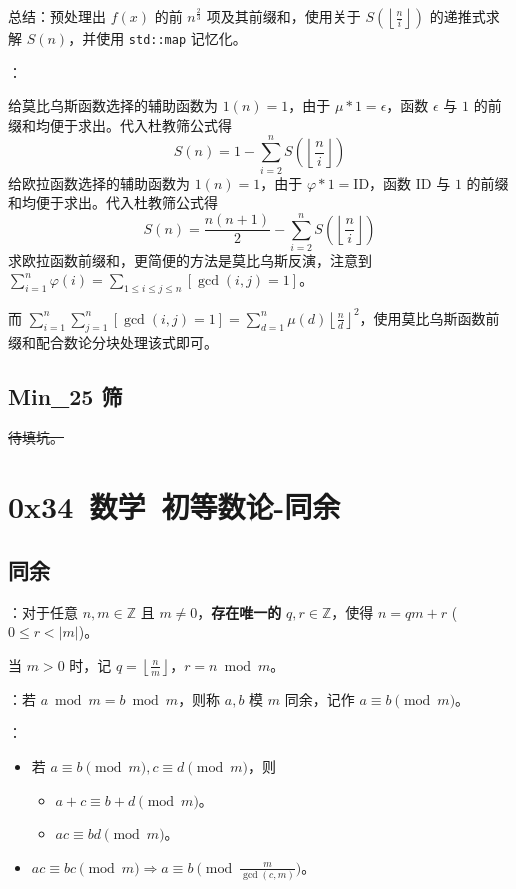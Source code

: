 总结：预处理出 $f(x)$ 的前 $n^{\frac{2}{3}}$ 项及其前缀和，使用关于 $S\left( \left\lfloor \frac{n}{i} \right\rfloor \right)$ 的递推式求解 $S(n)$，并使用 \texttt{std::map} 记忆化。


：

给莫比乌斯函数选择的辅助函数为 $1(n) = 1$，由于 $\mu \ast 1 = \epsilon$，函数 $\epsilon$ 与 $1$ 的前缀和均便于求出。代入杜教筛公式得
\[
S(n) = 1 - \sum_{i = 2}^n S\left( \left\lfloor \frac{n}{i} \right\rfloor \right)
\]
给欧拉函数选择的辅助函数为 $1(n) = 1$，由于 $\varphi \ast 1 = \mathrm{ID}$，函数 $\mathrm{ID}$ 与 $1$ 的前缀和均便于求出。代入杜教筛公式得
\[
S(n) = \frac{n(n + 1)}{2} - \sum_{i = 2}^n S\left( \left\lfloor \frac{n}{i} \right\rfloor \right)
\]
求欧拉函数前缀和，更简便的方法是莫比乌斯反演，注意到 $\sum_{i = 1}^n \varphi(i) = \sum_{1 \leq i \leq j \leq n} [\gcd(i, j) = 1]$。

而 $\sum_{i = 1}^n \sum_{j = 1}^n [\gcd(i, j) = 1] = \sum_{d = 1}^n \mu(d)\left\lfloor \frac{n}{d} \right\rfloor^2$，使用莫比乌斯函数前缀和配合数论分块处理该式即可。

\subsection{Min\_25 筛}

\sout{待填坑。}

\section{0x34\ 数学\ 初等数论-同余}
\label{sec:0x34d}

\subsection{同余}

：对于任意 $n, m \in \mathbb{Z}$ 且 $m \neq 0$，\textbf{存在唯一的} $q, r \in \mathbb{Z}$，使得 $n = qm + r$ ($0 \leq r < |m|$)。

当 $m > 0$ 时，记 $q = \left\lfloor \frac{n}{m} \right\rfloor$，$r = n \bmod m$。

：若 $a \bmod m = b \bmod m$，则称 $a, b$ 模 $m$ 同余，记作 $a \equiv b \pmod m$。

：

\begin{itemize}
    \item 若 $a \equiv b \pmod m, c \equiv d \pmod m$，则
    \begin{itemize}
        \item $a + c \equiv b + d \pmod m$。
        \item $ac \equiv bd \pmod m$。
    \end{itemize}
    \item $ac \equiv bc \pmod m \Longrightarrow a \equiv b \pmod{\frac{m}{\gcd(c, m)}}$。
\end{itemize}

